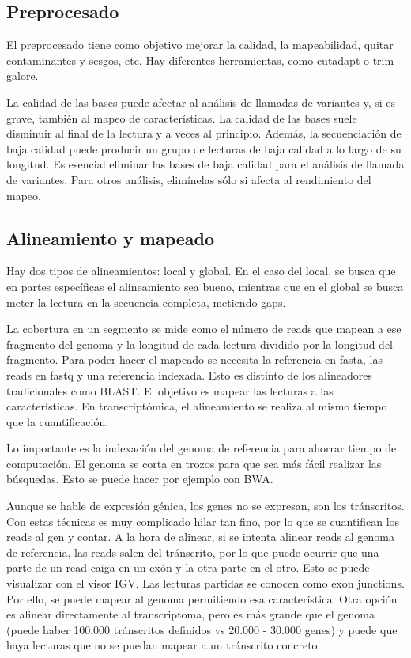 \subsection{Preprocesado}
El preprocesado tiene como objetivo mejorar la calidad, la mapeabilidad, quitar contaminantes y sesgos, etc. Hay diferentes herramientas, como cutadapt o trim-galore. 

La calidad de las bases puede afectar al análisis de llamadas de variantes y, si es grave, también al mapeo de características. La calidad de las bases suele disminuir al final de la lectura y a veces al principio. Además, la secuenciación de baja calidad puede producir un grupo de lecturas de baja calidad a lo largo de su longitud. Es esencial eliminar las bases de baja calidad para el análisis de llamada de variantes. Para otros análisis, elimínelas sólo si afecta al rendimiento del mapeo.

\subsection{Alineamiento y mapeado}
Hay dos tipos de alineamientos: local y global. En el caso del local, se busca que en partes específicas el alineamiento sea bueno, mientras que en el global se busca meter la lectura en la secuencia completa, metiendo gaps. 

La cobertura en un segmento se mide como el número de reads que mapean a ese fragmento del genoma y la longitud de cada lectura dividido por la longitud del fragmento. Para poder hacer el mapeado se necesita la referencia en fasta, las reads en fastq y una referencia indexada. Esto es distinto de los alineadores tradicionales como BLAST. El objetivo es mapear las lecturas a las características. En transcriptómica, el alineamiento se realiza al mismo tiempo que la cuantificación. 

Lo importante es la indexación del genoma de referencia para ahorrar tiempo de computación. El genoma se corta en trozos para que sea más fácil realizar las búsquedas. Esto se puede hacer por ejemplo con BWA. 

Aunque se hable de expresión génica, los genes no se expresan, son los tránscritos. Con estas técnicas es muy complicado hilar tan fino, por lo que se cuantifican los reads al gen y contar. A la hora de alinear, si se intenta alinear reads al genoma de referencia, las reads salen del tránscrito, por lo que puede ocurrir que una parte de un read caiga en un exón y la otra parte en el otro. Esto se puede visualizar con el visor IGV. Las lecturas partidas se conocen como exon junctions. Por ello, se puede mapear al genoma permitiendo esa característica. Otra opción es alinear directamente al transcriptoma, pero es más grande que el genoma (puede haber 100.000 tránscritos definidos vs 20.000 - 30.000 genes) y puede que haya lecturas que no se puedan mapear a un tránscrito concreto. 

